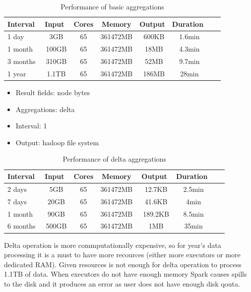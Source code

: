 \begin{table}[h]
\begin{center}
\caption{Performance of basic aggregations}
\label{tab:LET}
\begin{tabular}{l*{6}{c}r}
\hline
\textbf{Interval}  & \textbf{Input}  & \textbf{Cores} & \textbf{Memory} & \textbf{Output} & \textbf{Duration} \\
\hline
1 day              & ~3GB            & 65             & 361472MB        & ~600KB          & ~1.6min \\
1 month            & ~100GB          & 65             & 361472MB        & ~18MB           & ~4.3min \\
3 months           & ~310GB          & 65             & 361472MB        & ~52MB  	  & ~9.7min \\
1 year             & ~1.1TB          & 65             & 361472MB        & ~186MB          & ~28min \\
\hline
\end{tabular}
\end{center}
\end{table}

\begin{itemize}
\item Result fields: node bytes
\item Aggregations: delta
\item Interval: 1
\item Output: hadoop file system
\end{itemize}

\begin{table}[h]
\begin{center}
\caption{Performance of delta aggregations}
\label{tab:LET}
\begin{tabular}{l*{6}{c}r}
\hline
\textbf{Interval}  & \textbf{Input}  & \textbf{Cores} & \textbf{Memory} & \textbf{Output} & \textbf{Duration} \\
\hline
2 days             & ~5GB            & 65             & 361472MB        & ~12.7KB         & ~2.5min \\
7 days             & ~20GB           & 65             & 361472MB        & ~41.6KB         & ~4min \\
1 month            & ~90GB           & 65             & 361472MB        & ~189.2KB  	  & ~8.5min \\
6 months           & ~500GB          & 65             & 361472MB        & ~1MB            & ~35min \\
\hline
\end{tabular}
\end{center}
\end{table}
Delta operation is more commputationally expensive, so for year's data processing it is a must to have more recources (either more executors or more dedicated RAM). 
Given resources is not enough for delta operation to process 1.1TB of data. When executors do not have enough memory Spark causes spills to the disk and it produces an 
error as user does not have enough disk qouta. 

